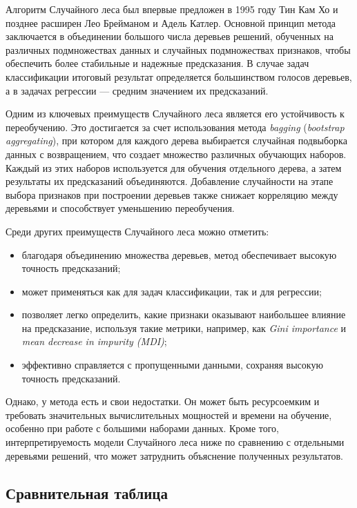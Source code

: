 Алгоритм Случайного леса был впервые предложен в 1995 году Тин Кам Хо и позднее расширен Лео Брейманом и Адель Катлер. Основной принцип метода заключается в объединении большого числа деревьев решений, обученных на различных подмножествах данных и случайных подмножествах признаков, чтобы обеспечить более стабильные и надежные предсказания. В случае задач классификации итоговый результат определяется большинством голосов деревьев, а в задачах регрессии — средним значением их предсказаний.

Одним из ключевых преимуществ Случайного леса является его устойчивость к переобучению. Это достигается за счет использования метода \textit{bagging} (\textit{bootstrap aggregating}), при котором для каждого дерева выбирается случайная подвыборка данных с возвращением, что создает множество различных обучающих наборов. Каждый из этих наборов используется для обучения отдельного дерева, а затем результаты их предсказаний объединяются. Добавление случайности на этапе выбора признаков при построении деревьев также снижает корреляцию между деревьями и способствует уменьшению переобучения.

Среди других преимуществ Случайного леса можно отметить:
\begin{itemize}
    \item благодаря объединению множества деревьев, метод обеспечивает высокую точность предсказаний;
    \item может применяться как для задач классификации, так и для регрессии;
    \item позволяет легко определить, какие признаки оказывают наибольшее влияние на предсказание, используя такие метрики, например, как \textit{Gini importance} и \textit{mean decrease in impurity (MDI)};
    \item  эффективно справляется с пропущенными данными, сохраняя высокую точность предсказаний.
\end{itemize}

Однако, у метода есть и свои недостатки. Он может быть ресурсоемким и требовать значительных вычислительных мощностей и времени на обучение, особенно при работе с большими наборами данных. Кроме того, интерпретируемость модели Случайного леса ниже по сравнению с отдельными деревьями решений, что может затруднить объяснение полученных результатов.

\subsection{Сравнительная таблица}

